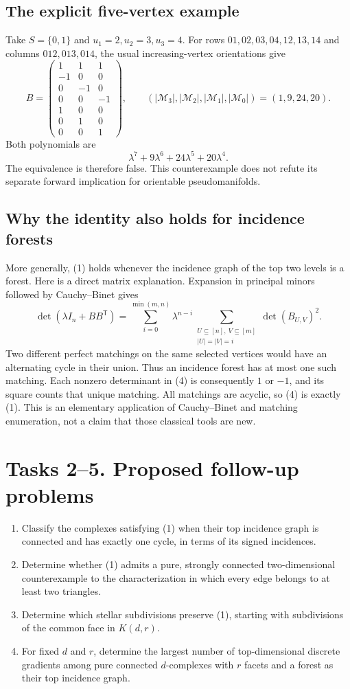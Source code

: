 \documentclass[11pt]{article}
\newcommand{\MM}{\mathcal M}
\begin{document}
\subsection*{The explicit five-vertex example}
Take $S=\{0,1\}$ and $u_1=2,u_2=3,u_3=4$.
For rows $01,02,03,04,12,13,14$ and columns $012,013,014$,
the usual increasing-vertex orientations give
\[
 B=\begin{pmatrix}
 1&1&1\\ -1&0&0\\0&-1&0\\0&0&-1\\
 1&0&0\\0&1&0\\0&0&1
 \end{pmatrix},\qquad
 (|\MM_3|,|\MM_2|,|\MM_1|,|\MM_0|)=(1,9,24,20).
\]
Both polynomials are
\[
 \lambda^7+9\lambda^6+24\lambda^5+20\lambda^4.
\]
The equivalence is therefore false. This counterexample does
not refute its separate forward implication for orientable
pseudomanifolds.

\subsection*{Why the identity also holds for incidence forests}
More generally, (1) holds whenever the incidence graph of the
top two levels is a forest. Here is a direct matrix explanation.
Expansion in principal minors followed by Cauchy--Binet gives
\[
 \det(\lambda I_n+BB^{\mathsf T})
 =\sum_{i=0}^{\min(m,n)}\lambda^{n-i}
   \sum_{\substack{U\subseteq[n],\ V\subseteq[m]\\|U|=|V|=i}}
       \det(B_{U,V})^2.                                    \tag{4}
\]
Two different perfect matchings on the same selected vertices
would have an alternating cycle in their union. Thus an
incidence forest has at most one such matching. Each nonzero
determinant in (4) is consequently $1$ or $-1$, and its square
counts that unique matching. All matchings are acyclic, so (4)
is exactly (1). This is an elementary application of
Cauchy--Binet and matching enumeration, not a claim that those
classical tools are new.

\section*{Tasks 2--5. Proposed follow-up problems}
\begin{enumerate}[start=2,leftmargin=*]
\item Classify the complexes satisfying (1) when their top
incidence graph is connected and has exactly one cycle,
in terms of its signed incidences.
\item Determine whether (1) admits a pure, strongly connected
two-dimensional counterexample to the characterization in which
every edge belongs to at least two triangles.
\item Determine which stellar subdivisions preserve (1),
starting with subdivisions of the common face in $K(d,r)$.
\item For fixed $d$ and $r$, determine the largest number of
top-dimensional discrete gradients among pure connected
$d$-complexes with $r$ facets and a forest as their top
incidence graph.
\end{enumerate}
\end{document}

